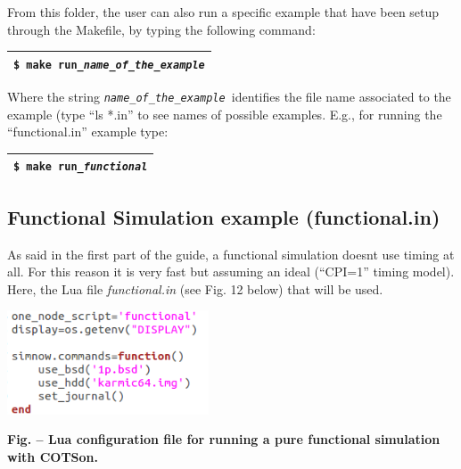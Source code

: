 \documentclass[a4paper]{article}
\newcounter{Figure}
\renewcommand\theFigure{\arabic{Figure}}
\begin{document}
{
From this folder, the user can also run a specific example that have
been setup through the Makefile, by typing the following command:}

\begin{flushleft}
\tablehead{}
\begin{supertabular}{|m{6.21846in}|}
\hline
{} \texttt{\$ make
run\_}\texttt{\textit{name\_of\_the\_example}}\\\hline
\end{supertabular}
\end{flushleft}
{
Where the string \texttt{\textit{name\_of\_the\_example }}identifies the
file name associated to the example (type {\textquotedblleft}ls
*.in{\textquotedblright} to see names of possible examples. E.g., for
running the {\textquotedblleft}functional.in{\textquotedblright}
example type:}

\begin{flushleft}
\tablehead{}
\begin{supertabular}{|m{6.20526in}|}
\hline
{} \texttt{\$ make
run\_}\texttt{\textit{functional}}\\\hline
\end{supertabular}
\end{flushleft}
\subsection[Functional Simulation example (functional.in)]{Functional
Simulation\foreignlanguage{english}{ example (functional.in)}}
{
As said in the first part of the guide, a functional simulation
doesn{\textquotesingle}t use timing at all. For this reason it is very
fast but assuming an ideal
({\textquotedblleft}CPI=1{\textquotedblright} timing model). Here, the
Lua file \textit{functional.in} (see Fig. 12 below) that will be used.}

{\centering 
\includegraphics[width=2.35in,height=1.2138in]{img23.png}
\par}

{\centering{}\sffamily\bfseries
\label{bkm:Ref388170548}Fig.
\stepcounter{Figure}{\theFigure} -- Lua configuration file for running
a pure functional simulation with COTSon.
\par}
\end{document}
